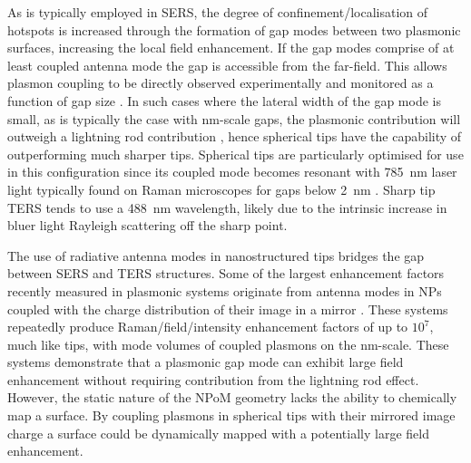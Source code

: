 \documentclass{article}
\begin{document}
As is typically employed in SERS, the degree of {\color{red}confinement/localisation} of hotspots is increased through the formation of gap modes between two plasmonic surfaces, increasing the local field enhancement. If the gap modes comprise of at least coupled antenna mode the gap is accessible from the far-field. This allows plasmon coupling to be directly observed experimentally and monitored as a function of gap size \cite{savage2012}. %
In such cases where the lateral width of the gap mode \cite{romero2006} is small, as is typically the case with nm-scale gaps, the plasmonic contribution will outweigh a lightning rod contribution \cite{}, hence spherical tips have the capability of outperforming much sharper tips. Spherical tips are particularly optimised for use in this configuration since its coupled mode becomes resonant with \SI{785}{nm} laser light typically found on Raman microscopes for gaps below \SI{2}{nm} \cite{}. Sharp tip TERS tends to use a \SI{488}{nm} wavelength, likely due to the intrinsic increase in bluer light Rayleigh scattering off the sharp point.


The use of radiative antenna modes in nanostructured tips bridges the gap between SERS and TERS structures. Some of the largest enhancement factors recently measured in plasmonic systems originate from antenna modes in NPs coupled with the charge distribution of their image in a mirror \cite{mertens2013, taylor2014}. These systems repeatedly produce {\color{red}Raman/field/intensity} enhancement factors of up to $10^7$, much like tips, with mode volumes of coupled plasmons on the nm-scale. These systems demonstrate that a plasmonic gap mode can exhibit large field enhancement without requiring contribution from the lightning rod effect. However, the static nature of the NPoM geometry lacks the ability to chemically map a surface. By coupling plasmons in spherical tips with their mirrored image charge a surface could be dynamically mapped with a potentially large field enhancement.

\end{document}
